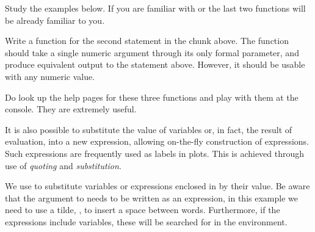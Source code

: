 \documentclass[krantz2]{krantz}\usepackage{knitr}%
\begin{document}
\begin{playground}
Study the examples below. If you are familiar with  or  the last two functions will be already familiar to you.

\begin{knitrout}\footnotesize
{}\color{fgcolor}
\end{knitrout}

Write a function for the second statement in the chunk above. The function should take a single numeric argument through its only formal parameter, and produce equivalent output to the statement above. However, it should be usable with any numeric value.

Do look up the help pages for these three functions and play with them at the console. They are extremely useful.
\end{playground}

It is also possible to substitute the value of variables or, in fact, the result of evaluation, into a new expression, allowing on-the-fly construction of expressions. Such expressions are frequently used as labels in plots. This is achieved through use of \emph{quoting} and \emph{substitution}.

We use  to substitute variables or expressions enclosed in  by their value. Be aware that the argument to  needs to be written as an expression, in this example we need to use a tilde, \code{\textasciitilde}, to insert a space between words. Furthermore, if the expressions include variables, these will be searched for in the environment.
\end{document}
